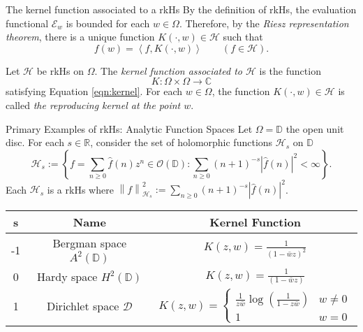 \documentclass{beamer}
\newcommand{\R}{\mathbb R}
\newcommand{\C}{\mathbb C}
\newcommand{\D}{\mathbb D}
\renewcommand{\ge}{\geqslant}
\newcommand{\calD}{{\mathcal D}}
\newcommand{\calE}{{\mathcal E}}
\newcommand{\calH}{{\mathcal H}}
\newcommand{\calO}{{\mathcal O}}
\newcommand{\ip}[1]{\left\langle #1 \right\rangle}
\newcommand{\norm}[1]{\left\lVert #1 \right\rVert}
\newcommand{\abs}[1]{\left\lvert #1 \right\rvert}
\begin{document}
\begin{frame}{The kernel function associated to a rkHs}
By the definition of rkHs, the evaluation functional $\calE_{w}$ is bounded for each $w\in \Omega$. Therefore, by the \textit{Riesz representation theorem}, there is a unique function $K\left( \cdot ,w \right) \in \calH$ such that 
\begin{equation}
f(w)=\ip{f, K\left( \cdot , w \right)} \qquad \left( f \in \calH \right).
\label{eqn:kernel}
\end{equation}


\pause
\begin{definition}
Let $\calH$ be rkHs on $\Omega$. The \textit{kernel function associated to $\calH$} is the function
\begin{equation*}
K : \Omega \times \Omega \to \C
\end{equation*}
satisfying Equation \ref{eqn:kernel}. For each $w\in \Omega$, the function $K\left( \cdot , w \right) \in \calH$ is called \textit{the reproducing kernel at the point $w$}.
\label{def:kernel-function}
\end{definition}
\end{frame}

\begin{frame}{Primary Examples of rkHs: Analytic Function Spaces}
Let $\Omega = \D$ the open unit disc. For each $s\in \R$, consider the set of holomorphic functions $\calH _{s}$ on $\D$
\begin{equation*}
\calH _{s} := \left\{ f=\sum_{n \ge 0} \hat{f}\left( n \right) z^{n} \in \calO \left( \D \right) : \sum_{n\ge 0} \left( n+1 \right)^{-s}\abs{\hat{f}(n)}^{2}  < \infty \right\}.
\end{equation*}
Each $\calH_{s}$ is a rkHs where $\norm{f}_{\calH_{s}}^{2} := \sum_{n\ge 0} \left( n+1 \right)^{-s}\abs{\hat{f}(n)}^{2}$.
\pause
\begin{table}
\begin{tabular}{ | c | c c | } 
\hline
 s & Name & Kernel Function \\ 
 \hline
 -1 & Bergman space $A^{2} \left( \D \right)$ & $ K(z,w) = \frac{1}{\left( 1-\bar{w}z \right)^{2}}$ \\
 0 & Hardy space $H^{2} \left( \D \right)$ & $ K(z,w) = \frac{1}{\left( 1-\bar{w}z \right)}$ \\ 
 1 & Dirichlet space $\calD$ & $K(z,w) = \begin{cases} \frac{1}{z\bar{w}} \log \left( \frac{1}{1-z\bar{w}} \right) & w \ne 0 \\ 1 & w= 0 \end{cases}$ \\
 \hline 
\end{tabular}
\end{table}
\end{frame}
\end{document}

